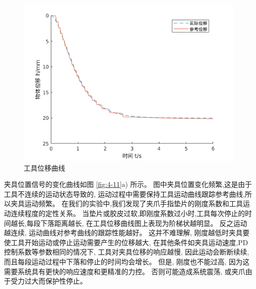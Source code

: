 \begin{figure}[!ht]
  \centering
  \includegraphics[width=12cm]{chapter04/pic/h_x}
  \caption{\label{fig:h_x}
    工具位移曲线}
  \vspace{-0.3cm}
\end{figure}


夹具位置信号的变化曲线如图 \ref{fig:4-11}a) 所示。
图中夹具位置变化频繁,这是由于工具不连续的运动状态导致的,
运动过程中需要保持工具运动曲线跟踪参考曲线,所以夹具运动频繁。
在我们的实验中,我们发现了夹爪手指垫片的刚度系数和工具运动连续程度的定性关系。
当垫片或胶皮过软,即刚度系数过小时,工具每次停止的时间越长,每段下落距离越长,
在工具位移曲线图上表现为阶梯状越明显。
反之运动越连续, 运动曲线对参考曲线的跟踪性能越好。
这并不难理解, 刚度越低时夹具要使工具开始运动或停止运动需要产生的位移越大,
在其他条件如夹具运动速度,PD控制系数等参数相同的情况下, 工具对夹具位移的响应越慢,
因此运动会断断续续, 而且每段运动过程中下落和停止的时间均会增长。
但是, 刚度也不能过高, 因为这需要系统具有更快的响应速度和更精准的力控。
否则可能造成系统震荡, 或夹爪由于受力过大而保护性停止。

